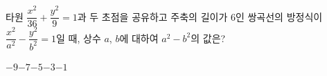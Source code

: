 타원 $\dfrac{x^2}{36}+\dfrac{y^2}{9}=1$과 두 초점을 공유하고 주축의 길이가 $6$인 쌍곡선의 방정식이 $\dfrac{x^2}{a^2}-\dfrac{y^2}{b^2}=1$일 때, 상수 $a$, $b$에 대하여 $a^2-b^2$의 값은?
\begin{choices32}{$-9$}{$-7$}{$-5$}{$-3$}{$-1$}\end{choices32}

